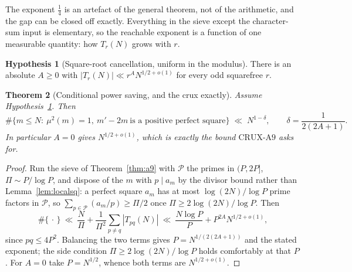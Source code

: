 \documentclass[11pt]{article}
\newtheorem{theorem}{Theorem}[section]
\theoremstyle{definition}
\newtheorem{hypothesis}[theorem]{Hypothesis}
\begin{document}
The exponent $\tfrac14$ is an artefact of the general theorem, not of the arithmetic, and the gap
can be closed off exactly. Everything in the sieve except the character-sum input is elementary, so
the reachable exponent is a function of one measurable quantity: how $T_r(N)$ grows with $r$.

\begin{hypothesis}[Square-root cancellation, uniform in the modulus]\label{hyp:sq}
There is an absolute $A\ge0$ with $|T_r(N)|\ll r^{A}N^{1/2+o(1)}$ for every odd squarefree $r$.
\end{hypothesis}

\begin{theorem}[Conditional power saving, and the crux exactly]\label{thm:condpower}
Assume Hypothesis~\textup{\ref{hyp:sq}}. Then
\[ \#\{m\le N:\ \mu^2(m)=1,\ m'-2m\ \text{is a positive perfect square}\}\;\ll\;N^{1-\delta},
   \qquad \delta=\frac1{2(2A+1)}. \]
In particular $A=0$ gives $N^{1/2+o(1)}$, which is exactly the bound
$\mathrm{CRUX}\text{-}\mathrm{A}9$ asks for.
\end{theorem}
\begin{proof}
Run the sieve of Theorem~\ref{thm:a9} with $\mathcal{P}$ the primes in $(P,2P]$, $\Pi\sim P/\log P$,
and dispose of the $m$ with $p\mid a_m$ by the divisor bound rather than
Lemma~\ref{lem:localsq}: a perfect square $a_m$ has at most $\log(2N)/\log P$ prime factors in
$\mathcal{P}$, so $\sum_{p\in\mathcal{P}}(a_m/p)\ge\Pi/2$ once $\Pi\ge2\log(2N)/\log P$. Then
\[ \#\{\,\cdot\,\}\ \ll\ \frac{N}{\Pi}+\frac1{\Pi^2}\sum_{p\neq q}|T_{pq}(N)|
   \ \ll\ \frac{N\log P}{P}+P^{2A}N^{1/2+o(1)}, \]
since $pq\le4P^2$. Balancing the two terms gives $P=N^{1/(2(2A+1))}$ and the stated exponent; the
side condition $\Pi\ge2\log(2N)/\log P$ holds comfortably at that $P$. For $A=0$ take
$P=N^{1/2}$, whence both terms are $N^{1/2+o(1)}$.
\end{proof}
\end{document}
